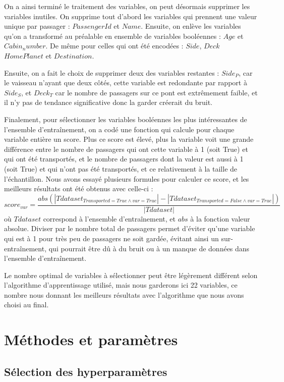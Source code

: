 \documentclass[a4paper]{article}
\begin{document}
    On a ainsi terminé le traitement des variables, on peut désormais supprimer les variables inutiles. On supprime tout d'abord les variables qui prennent une valeur
    unique par passager : $PassengerId$ et $Name$.
    Ensuite, on enlève les variables qu'on a transformé au préalable en ensemble de variables booléennes : $Age$ et $Cabin_number$.
    De même pour celles qui ont été encodées : $Side$, $Deck$ $HomePlanet$ et $Destination$.

    Ensuite, on a fait le choix de supprimer deux des variables restantes : $Side_P$, car le vaisseau n'ayant que deux côtés, cette variable est
    redondante par rapport à $Side_S$, et $Deck_T$ car le nombre de passagers sur ce pont est extrêmement faible, et il n'y pas de tendance significative
    donc la garder créerait du bruit.

    Finalement, pour sélectionner les variables booléennes les plus intéressantes de l'ensemble d'entraînement, on a codé une fonction qui calcule pour chaque variable
    entière un score. Plus ce score est élevé, plus la variable voit une grande différence entre le nombre de passagers qui ont cette variable à 1 (soit True) et qui ont été transportés,
    et le nombre de passagers dont la valeur est aussi à 1 (soit True) et qui n'ont pas été transportés, et ce relativement à la taille de l'échantillon.
    Nous avons essayé plusieurs formules pour calculer ce score, et les meilleurs résultats ont été obtenus avec celle-ci : 
    $$ score_{var} = \frac{abs(|Tdataset_{Transported=True \land var=True}| - |Tdataset_{Transported=False \land var=True}|)}{|Tdataset|} $$
    où $Tdataset$ correspond à l'ensemble d'entraînement, et $abs$ à la fonction valeur absolue.
    Diviser par le nombre total de passagers permet d'éviter qu'une variable qui est à 1 pour très peu de passagers ne soit gardée,
    évitant ainsi un sur-entraînement, qui pourrait être dû à du bruit ou à un manque de données dans l'ensemble d'entraînement.

    Le nombre optimal de variables à sélectionner peut être légèrement différent selon l'algorithme d'apprentissage utilisé, 
    mais nous garderons ici 22 variables, ce nombre nous donnant les meilleurs résultats avec l'algorithme que nous avons choisi au final. 

    \section{Méthodes et paramètres}

    \subsection{Sélection des hyperparamètres}
\end{document}
